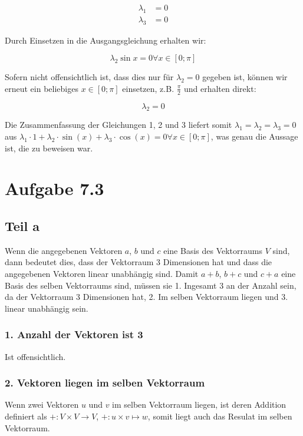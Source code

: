 \documentclass[a4paper,german,12pt,smallheadings]{scrartcl}
\begin{document}
\begin{align}
\lambda_1 &= 0 \\
\lambda_3 &= 0
\end{align}

Durch Einsetzen in die Ausgangsgleichung erhalten wir:

\begin{equation*}
  \lambda_2 \sin x = 0 \forall x \in [0;\pi]
\end{equation*}

Sofern nicht offensichtlich ist, dass dies nur für $\lambda_2 = 0$ gegeben ist,
können wir erneut ein beliebiges $x \in [0;\pi]$ einsetzen, z.B. $\frac{\pi}{2}$
und erhalten direkt:

\begin{equation}
  \lambda_2 = 0
\end{equation}

Die Zusammenfassung der Gleichungen 1, 2 und 3 liefert somit $\lambda_1 =
\lambda_2 = \lambda_3 = 0$ aus $\lambda_1 \cdot 1 + \lambda_2 \cdot \sin(x) +
\lambda_3 \cdot \cos(x) = 0 \forall x \in [0;\pi]$, was genau die Aussage ist,
die zu beweisen war.

\section*{Aufgabe 7.3}

\subsection*{Teil a}
Wenn die angegebenen Vektoren $a$, $b$ und $c$ eine Basis des Vektorraums $V$
sind, dann bedeutet dies, dass der Vektorraum 3 Dimensionen hat und dass die
angegebenen Vektoren linear unabhängig sind. Damit $a+b$, $b+c$ und $c+a$ eine
Basis des selben Vektorraums sind, müssen sie 1. Ingesamt 3 an der Anzahl sein,
da der Vektorraum 3 Dimensionen hat, 2. Im selben Vektorraum liegen und 3.
linear unabhängig sein.

\subsubsection*{1. Anzahl der Vektoren ist 3}
Ist offensichtlich.

\subsubsection*{2. Vektoren liegen im selben Vektorraum}
Wenn zwei Vektoren $u$ und $v$ im selben Vektorraum liegen, ist deren Addition
definiert als $+: V \times V \to V$, $+: u \times v \mapsto w$, somit liegt
auch das Resulat im selben Vektorraum.
\end{document}
